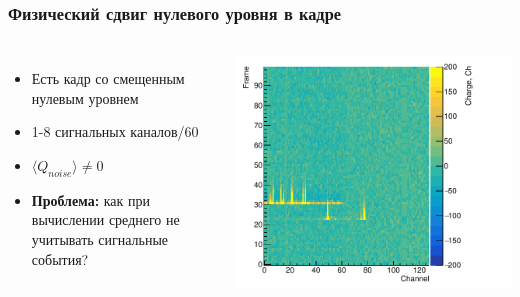 \documentclass[14pt]{beamer}
\begin{document}
\begin{frame}[t]
\frametitle{Физический сдвиг нулевого уровня в кадре}
\vspace{0pt}
\begin{columns}
\begin{minipage}[t][1\textheight]{\linewidth}
	\small{\begin{itemize}
			\item Есть кадр со смещенным нулевым уровнем
			\item 1-8 сигнальных каналов/60
			\item $\langle Q_{noise}\rangle \neq 0 $
			\item \textbf{Проблема:} как при вычислении среднего не учитывать сигнальные события?
	\end{itemize}}
\end{minipage}%
\begin{minipage}[t][1\textheight]{\linewidth}
	\hspace*{5pt}
	\centering\includegraphics[width=1.05\linewidth]{median_monitor.pdf}
	
	
\end{minipage}%
\end{columns}
\end{frame}
\end{document}
